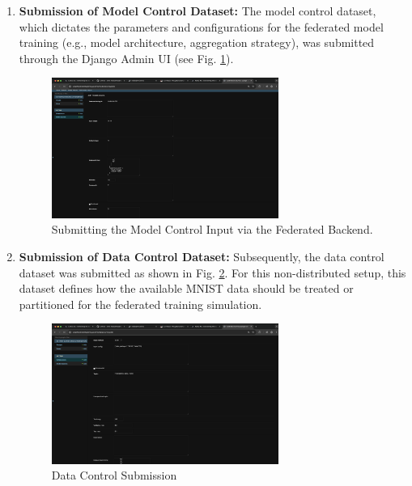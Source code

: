 \begin{enumerate}
    \item \textbf{Submission of Model Control Dataset:} The model control dataset, which dictates the parameters and configurations for the federated model training (e.g., model architecture, aggregation strategy), was submitted through the Django Admin UI (see Fig. \ref{fig:model_control_submission}).
    \begin{figure}[h!]
        \centering
         \includegraphics[width=0.7\textwidth]{MWP-Project Report Template - BD-ML-June25/screenshots_federated/6_Model_Control_input.png}
        
        \caption{Submitting the Model Control Input via the Federated Backend.}
        \label{fig:model_control_submission}
    \end{figure}

    \item \textbf{Submission of Data Control Dataset:} Subsequently, the data control dataset was submitted as shown in Fig. \ref{fig:data_control_submission}. For this non-distributed setup, this dataset defines how the available MNIST data should be treated or partitioned for the federated training simulation.
    \begin{figure}[h!]
        \centering
         \includegraphics[width=0.7\textwidth]{MWP-Project Report Template - BD-ML-June25/screenshots_federated/5_Data_Control_Input.png}
        \caption{Data Control Submission}
        \label{fig:data_control_submission}
    \end{figure}
\end{enumerate}

